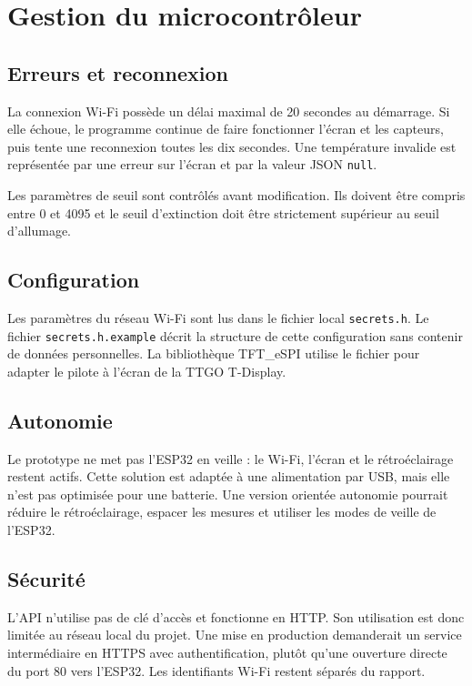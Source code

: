 \documentclass[12pt,a4paper]{report}
\begin{document}
\section{Gestion du microcontrôleur}

\subsection{Erreurs et reconnexion}

La connexion Wi-Fi possède un délai maximal de 20 secondes au démarrage. Si
elle échoue, le programme continue de faire fonctionner l'écran et les
capteurs, puis tente une reconnexion toutes les dix secondes. Une température
invalide est représentée par une erreur sur l'écran et par la valeur JSON
\texttt{null}.

Les paramètres de seuil sont contrôlés avant modification. Ils doivent être
compris entre 0 et 4095 et le seuil d'extinction doit être strictement
supérieur au seuil d'allumage.

\subsection{Configuration}

Les paramètres du réseau Wi-Fi sont lus dans le fichier local
\texttt{secrets.h}. Le fichier \texttt{secrets.h.example} décrit la structure
de cette configuration sans contenir de données personnelles. La bibliothèque
TFT\_eSPI utilise le fichier  pour adapter
le pilote à l'écran de la TTGO T-Display.

\subsection{Autonomie}

Le prototype ne met pas l'ESP32 en veille : le Wi-Fi, l'écran et le
rétroéclairage restent actifs. Cette solution est adaptée à une alimentation
par USB, mais elle n'est pas optimisée pour une batterie. Une version orientée
autonomie pourrait réduire le rétroéclairage, espacer les mesures et utiliser
les modes de veille de l'ESP32.

\subsection{Sécurité}

L'API n'utilise pas de clé d'accès et fonctionne en HTTP. Son utilisation est
donc limitée au réseau local du projet. Une mise en production demanderait un
service intermédiaire en HTTPS avec authentification, plutôt qu'une ouverture
directe du port 80 vers l'ESP32. Les identifiants Wi-Fi restent séparés du
rapport.
\end{document}
